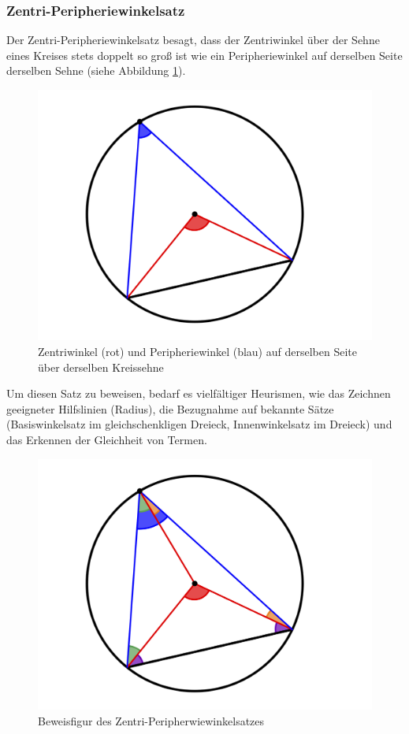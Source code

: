 \documentclass[
  ngerman,
]{scrbook}
\theoremstyle{definition}
\theoremstyle{definition}
\theoremstyle{definition}
\theoremstyle{definition}
\theoremstyle{remark}
\begin{document}
\hypertarget{zentri-peripheriewinkelsatz}{%
\subsubsection{Zentri-Peripheriewinkelsatz}\label{zentri-peripheriewinkelsatz}}

Der Zentri-Peripheriewinkelsatz besagt, dass der Zentriwinkel über der Sehne eines Kreises stets doppelt so groß ist wie ein Peripheriewinkel auf derselben Seite derselben Sehne (siehe Abbildung \ref{fig:Zentri}).

\begin{figure}

{\centering \includegraphics[width=0.75\linewidth]{pictures/C-Zentri} 

}

\caption{Zentriwinkel (rot) und Peripheriewinkel (blau) auf derselben Seite über derselben Kreissehne}\label{fig:Zentri}
\end{figure}

Um diesen Satz zu beweisen, bedarf es vielfältiger Heurismen, wie das Zeichnen geeigneter Hilfslinien (Radius), die Bezugnahme auf bekannte Sätze (Basiswinkelsatz im gleichschenkligen Dreieck, Innenwinkelsatz im Dreieck) und das Erkennen der Gleichheit von Termen.

\begin{figure}

{\centering \includegraphics[width=0.75\linewidth]{pictures/C-ZentriBeweis} 

}

\caption{Beweisfigur des Zentri-Peripherwiewinkelsatzes}\label{fig:ZentriBeweis}
\end{figure}
\end{document}
